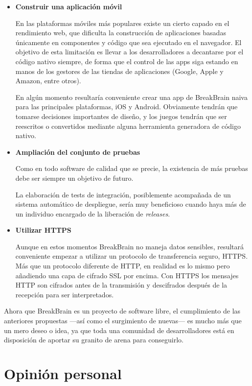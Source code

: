 \begin{itemize}
\item {\bf Construir una aplicación móvil}

En las plataformas móviles más populares existe un cierto capado en el rendimiento web, que dificulta la construcción de aplicaciones basadas únicamente en componentes y código que sea ejecutado en el navegador. El objetivo de esta limitación es llevar a los desarrolladores a decantarse por el código nativo siempre, de forma que el control de las apps siga estando en manos de los gestores de las tiendas de aplicaciones (Google, Apple y Amazon, entre otros).

En algún momento resultaría conveniente crear una app de BreakBrain naiva para las principales plataformas, iOS y Android. Obviamente tendrán que tomarse decisiones importantes de diseño, y los juegos tendrán que ser reescritos o convertidos mediante alguna herramienta generadora de código nativo.
\newpage
\item {\bf Ampliación del conjunto de pruebas}

Como en todo software de calidad que se precie, la existencia de más pruebas debe ser siempre un objetivo de futuro.

La elaboración de tests de integración, posiblemente acompañada de un sistema automático de despliegue, sería muy beneficioso cuando haya más de un individuo encargado de la liberación de {\it releases}.

\item {\bf Utilizar \acf{HTTPS}}

Aunque en estos momentos BreakBrain no maneja datos sensibles, resultará conveniente empezar a utilizar un protocolo de transferencia seguro, \acs{HTTPS}. Más que un protocolo diferente de \acs{HTTP}, en realidad es lo mismo pero añadiendo una capa de cifrado \acf{SSL} por encima. Con \acs{HTTPS} los mensajes \acs{HTTP} son cifrados antes de la transmisión y descifrados después de la recepción para ser interpretados.

\end{itemize}

Ahora que BreakBrain es un proyecto de software libre, el cumplimiento de las anteriores propuestas ---así como el surgimiento de nuevas--- es mucho más que un mero deseo o idea, ya que toda una comunidad de desarrolladores está en disposición de aportar su granito de arena para conseguirlo.

\section{Opinión personal}


